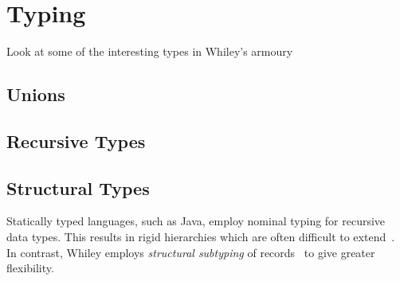 \newpage
\section{Typing}
Look at some of the interesting types in Whiley's armoury

\subsection{Unions}

\subsection{Recursive Types}

%
%
%
%

\subsection{Structural Types}
Statically typed languages, such as Java, employ nominal typing for
recursive data types.  This results in rigid hierarchies which are
often difficult to extend~\cite{MA08}.  In contrast, Whiley employs
{\em structural subtyping} of records~\cite{Card88} to give greater
flexibility.

